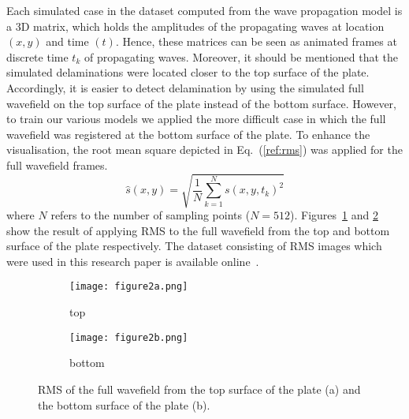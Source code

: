 \documentclass[runningheads]{llncs}
\begin{document}
Each simulated case in the dataset computed from the wave propagation model is a 3D matrix, which holds the amplitudes of the propagating waves at location \((x,y)\) and time \((t)\).
Hence, these matrices can be seen as animated frames at discrete time \(t_k\) of propagating waves.
Moreover, it should be mentioned that the simulated delaminations were located closer to the top surface of the plate.
Accordingly, it is easier to detect delamination by using the simulated full wavefield on the top surface of the plate instead of the bottom surface.
However, to train our various models we applied the more difficult case in which the full wavefield was registered at the bottom surface of the plate.
To enhance the visualisation, the root mean square depicted in Eq.~(\ref{ref:rms}) was applied for the full wavefield frames.
\begin{equation}
	\hat{s}(x,y) = \sqrt{\frac{1}{N}\sum_{k=1}^{N} s(x,y,t_k)^2}
	\label{ref:rms}
\end{equation}
where \(N\) refers to the number of sampling points (\(N=512\)).
Figures~\ref{fig:rmstop} and \ref{fig:rmsbottom} show the result of applying RMS to the full wavefield from the top and bottom surface of the plate respectively.
The dataset consisting of RMS images which were used in this research paper is available online~\cite{Kudela2020d}.
\begin{figure} [h!]
	\centering
	\begin{subfigure}[b]{0.47\textwidth}
		\centering
		\texttt{[image: figure2a.png]}
		\caption{top}
		\label{fig:rmstop}
	\end{subfigure}
	\hfill
	\begin{subfigure}[b]{0.47\textwidth}
		\centering
		\texttt{[image: figure2b.png]}
		\caption{bottom}
		\label{fig:rmsbottom}
	\end{subfigure}
	\caption{RMS of the full wavefield from the top surface of the plate (a) and the bottom surface of the plate (b).}
	\label{fig:rms}
\end{figure} 
\end{document}
